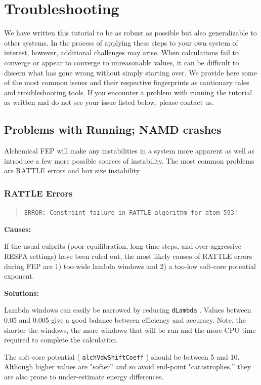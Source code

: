 \documentclass[9pt,tutorial]{Styling/livecoms}
\newcommand{\textInput}[1]{
  \texttt{#1}
}
\begin{document}
\section{Troubleshooting}\label{app:troubleshooting}
We have written this tutorial to be as robust as possible but also generalizable to other systems. 
In the process of applying these steps to your own system of interest, however, additional challenges may arise. 
When calculations fail to converge or appear to converge to unreasonable values, it can be difficult to discern what has gone wrong without simply starting over. 
We provide here some of the most common issues and their respective fingerprints as cautionary tales and troubleshooting tools. 
If you encounter a problem with running the tutorial as written and do not see your issue listed below, please contact us.

\subsection{Problems with Running; NAMD crashes}
Alchemical FEP will make any instabilities in a system more apparent as well as introduce a few more possible sources of instability. The most common problems are RATTLE errors and box size instability

\subsubsection{RATTLE Errors}
\begin{quote}
\texttt{ERROR: Constraint failure in RATTLE algorithm for atom 593!}
\end{quote}

\noindent\textbf{Causes:}

If the usual culprits (poor equilibration, long time steps, and over-aggressive RESPA settings) have been ruled out, the most likely causes of RATTLE errors during FEP are 1) too-wide lambda windows and 2) a too-low soft-core potential exponent.

\noindent\textbf{Solutions:}

Lambda windows can easily be narrowed by reducing \textInput{dLambda}. Values between 0.05 and 0.005 give a good balance between efficiency and accuracy.
Note, the shorter the windows, the more windows that will be run and the more CPU time required to complete the calculation.

The soft-core potential (\textInput{alchVdwShiftCoeff}) should be between 5 and 10. Although higher values are "softer'' and so avoid end-point "catastrophes,'' they are also prone to under-estimate energy differences.
\end{document}
